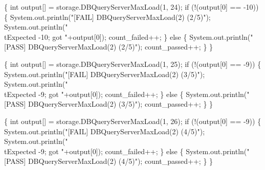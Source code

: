 \documentclass{article}
\def\nwendcode{\endtrivlist \endgroup}
\let\nwdocspar=\par
\begin{document}
\{
  int output[] = storage.DBQueryServerMaxLoad(1, 24);
  if (!(output[0] == -10)) \{
    System.out.println("[FAIL] DBQueryServerMaxLoad(2) (2/5)");
    System.out.println("\\tExpected -10; got "+output[0]);
    count_failed++;
  \} else \{
    System.out.println("[PASS] DBQueryServerMaxLoad(2) (2/5)");
    count_passed++;
  \}
\}
\nwendcode{}\nwdocspar
\nwenddocs{}\endmoddef{}
\{
  int output[] = storage.DBQueryServerMaxLoad(1, 25);
  if (!(output[0] == -9)) \{
    System.out.println("[FAIL] DBQueryServerMaxLoad(2) (3/5)");
    System.out.println("\\tExpected -9; got "+output[0]);
    count_failed++;
  \} else \{
    System.out.println("[PASS] DBQueryServerMaxLoad(2) (3/5)");
    count_passed++;
  \}
\}
\nwendcode{}\nwdocspar
\nwenddocs{}\endmoddef{}
\{
  int output[] = storage.DBQueryServerMaxLoad(1, 26);
  if (!(output[0] == -9)) \{
    System.out.println("[FAIL] DBQueryServerMaxLoad(2) (4/5)");
    System.out.println("\\tExpected -9; got "+output[0]);
    count_failed++;
  \} else \{
    System.out.println("[PASS] DBQueryServerMaxLoad(2) (4/5)");
    count_passed++;
  \}
\}
\nwendcode{}\nwdocspar
\end{document}
